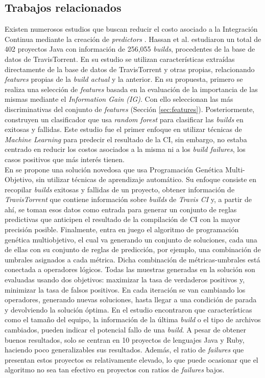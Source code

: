 \subsection{Trabajos relacionados} \label{sec:related_work}
Existen numerosos estudios que buscan reducir el costo asociado a la Integración Continua
mediante la creación de \textit{predictors} \cite{7,5,2,15,6,14,4,1,19}. Hassan et al. \cite{7}
estudiaron un total de 402 proyectos Java con información de 256,055 \textit{builds}, procedentes
de la base de datos de TravisTorrent. En su estudio se utilizan características extraídas
directamente de la base de datos de TravisTorrent y otras propias, relacionando \textit{features}
propias de la \textit{build actual} y la anterior. En su propuesta, primero se realiza una
selección de \textit{features} basada en la evaluación de la importancia de las mismas mediante
el \textit{Information Gain (IG)}. Con ello seleccionan las más discriminativas del conjunto de
\textit{features} (Sección \ref{sec:features}). Posteriormente, construyen un clasificador que usa
\textit{random forest} para clasificar las \textit{builds} en exitosas y fallidas. Este estudio
fue el primer enfoque en utilizar técnicas de \textit{Machine Learning} para predecir el resultado
de la CI, sin embargo, no estaba centrado en reducir los costos asociados a la misma ni
a los \textit{build failures}, los casos positivos que más interés tienen.\\

En \cite{5} se propone una solución novedosa que usa Programación Genética Multi-Objetivo, sin
utilizar técnicas de aprendizaje automático. Su enfoque consiste en recopilar \textit{builds}
exitosas y fallidas de un proyecto, obtener información de \textit{TravisTorrent} que contiene
información sobre \textit{builds} de \textit{Travis CI} y, a partir de ahí, se toman esos datos
como entrada para generar un conjunto de reglas predictivas que anticipen el resultado de la
compilación de CI con la mayor precisión posible. Finalmente, entra en juego el 
algoritmo de programación genética multiobjetivo, el cual va generando un conjunto de soluciones, 
cada una de ellas con su conjunto de reglas de predicción, por ejemplo, una combinación de
umbrales asignados a cada métrica. Dicha combinación de métricas-umbrales está conectada a
operadores lógicos. Todas las muestras generadas en la solución son evaluadas usando dos
objetivos: maximizar la tasa de verdaderos positivos y, minimizar la tasa de falsos positivos.
En cada iteración se van cambiando los operadores, generando nuevas soluciones, hasta llegar a
una condición de parada y devolviendo la solución óptima. En el estudio encontraron que
características como el tamaño del equipo, la información de la última \textit{build} o el tipo
de archivos cambiados, pueden indicar el potencial fallo de una \textit{build}. A pesar de
obtener buenos resultados, solo se centran en 10 proyectos de lenguajes Java y Ruby, haciendo
poco generalizables sus resultados. Además, el ratio de \textit{failures} que presentan estos
proyectos es relativamente elevado, lo que puede ocasionar que el algoritmo no sea tan efectivo
en proyectos con ratios de \textit{failures} bajos.\\

